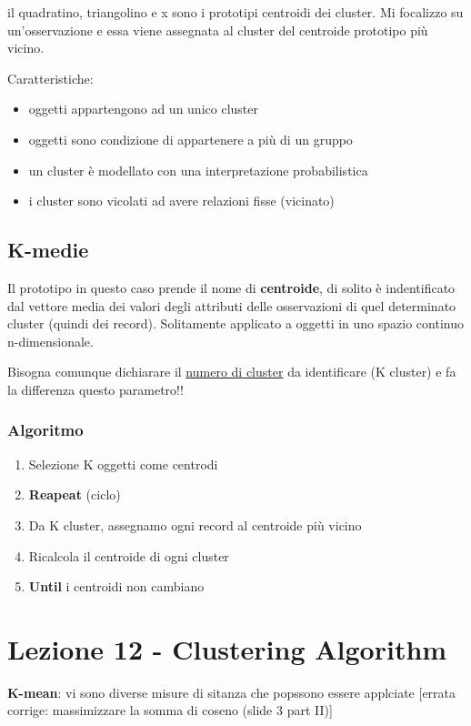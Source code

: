 il quadratino, triangolino e x sono i prototipi centroidi dei cluster. Mi focalizzo su un'osservazione e essa viene assegnata al cluster del centroide prototipo pi\`u vicino.

Caratteristiche:
\begin{itemize}
	\item oggetti appartengono ad un unico cluster
	\item oggetti sono condizione di appartenere a pi\`u di un gruppo
	\item un cluster \`e modellato con una interpretazione probabilistica
	\item i cluster sono vicolati ad avere relazioni fisse (vicinato)
\end{itemize}

\subsection{K-medie}
Il prototipo in questo caso prende il nome di \textbf{centroide}, di solito \`e indentificato dal vettore media dei valori degli attributi delle osservazioni di quel determinato cluster (quindi dei record). Solitamente applicato a oggetti in uno spazio continuo n-dimensionale.

Bisogna comunque dichiarare il \underline{numero di cluster} da identificare (K cluster) e fa la differenza questo parametro!! 

\subsubsection{Algoritmo}
\begin{enumerate}
	\item Selezione K oggetti come centrodi
	\item \textbf{Reapeat} (ciclo)
	\item Da K cluster, assegnamo ogni record al centroide pi\`u vicino
	\item Ricalcola il centroide di ogni cluster
	\item \textbf{Until} i centroidi non cambiano
\end{enumerate}

\section{Lezione 12 - Clustering Algorithm}

\textbf{K-mean}: vi sono diverse misure di sitanza che popssono essere applciate [errata corrige: massimizzare la somma di coseno (slide 3 part II)]

